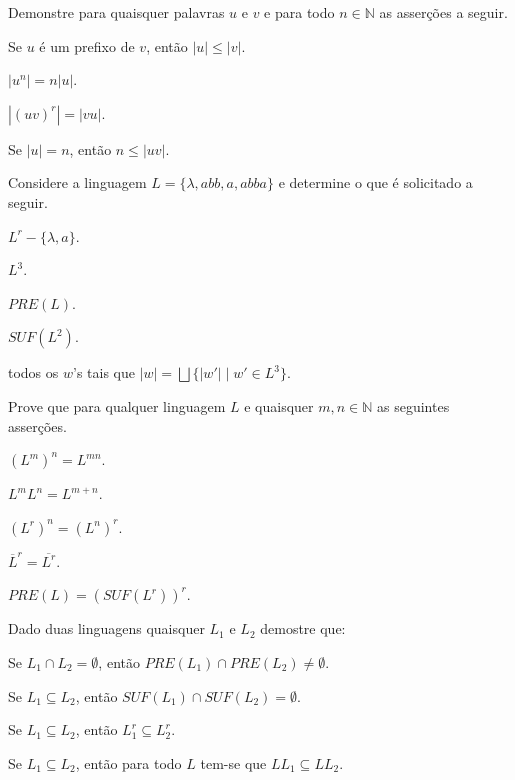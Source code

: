 \begin{problem}\label{prob:Linguagem2}
	Demonstre para quaisquer palavras $u$ e $v$ e para todo $n \in \mathbb{N}$ as asserções a seguir.
\end{problem}

\begin{exerList}
	\item Se $u$ é um prefixo de $v$, então $|u| \leq |v|$.
	\item $|u^n| = n|u|$.
	\item $|(uv)^r| = |vu|$.
	\item Se $|u| = n$, então $n \leq |uv|$.
\end{exerList}

\begin{problem}\label{prob:Linguagem3}
	Considere a linguagem $L = \{\lambda, abb, a, abba\}$ e determine o que é solicitado a seguir.
\end{problem}

\begin{exerList}
	\item $L^r - \{\lambda, a\}$.
	\item $L^3$.
	\item $PRE(L)$.
	\item $SUF(L^2)$.
	\item todos os $w$'s tais que $|w| = \bigsqcup \{|w'| \mid w' \in L^3\}$.
\end{exerList}

\begin{problem}\label{prob:Linguagem4}
	Prove que para qualquer linguagem $L$ e quaisquer $m,n \in \mathbb{N}$ as seguintes asserções.
\end{problem}

\begin{exerList}
	\item $(L^m)^n = L^{mn}$.
	\item $L^mL^n = L^{m+n}$.
	\item $(L^r)^n = (L^n)^r$.
	\item $\overline{L}^r = \overline{L^r}$.
	\item $PRE(L) = (SUF(L^r))^r$.
\end{exerList}

\begin{problem}\label{prob:Linguagem5}
	Dado duas linguagens quaisquer $L_1$ e $L_2$ demostre que:
\end{problem}

\begin{exerList}
	\item Se $L_1 \cap L_2 = \emptyset$, então $PRE(L_1) \cap PRE(L_2) \neq \emptyset$.
	\item Se $L_1 \subseteq L_2$, então $SUF(L_1) \cap SUF(L_2) = \emptyset$.
	\item Se $L_1 \subseteq L_2$, então $L_1^r \subseteq L_2^r$.
	\item Se $L_1 \subseteq L_2$, então para todo $L$ tem-se que $LL_1 \subseteq LL_2$. 
\end{exerList}

